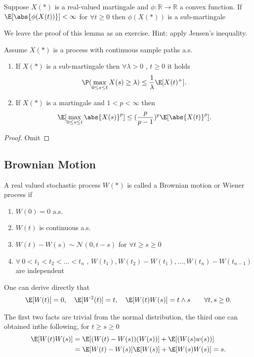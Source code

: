 \begin{lemma}
  Suppose $X(*)$ is a real-valued martingale and $\phi  : \mathbb{R} \to  \mathbb{R}$ a convex function.
  If $\E[\abs{\phi(X(t))}] < \infty $ for $\forall  t\ge 0$ then $\phi(X(*))$ is a sub-martingale
\end{lemma}
We leave the proof of this lemma as an exercise. Hint: apply Jensen's inequality.
\vskip5mm
\begin{theorem}
 Assume $X(*)$  is a process with continuous sample paths a.s. 
 \begin{enumerate}
   \item If $X(*)$ is a sub-martingale then $\forall  \lambda > 0$ , $t \ge 0$ it holds 
     \begin{align*}
       \P(\max_{0\le s\le t} X(s) \ge \lambda ) \le  \frac{1}{\lambda }\E[X(t)^{+} ]
     .\end{align*}
    \item If $X(*)$ is a martingale and $1 < p < \infty$ then
      \begin{align*}
        \E[\max_{0\le s\le t} \abs{X(s) }^{p} ] \le (\frac{p}{p-1})^{p} \E[\abs{X(t)}^{p} ]
      .\end{align*}
 \end{enumerate}
\end{theorem}
\begin{proof}
 Omit 
\end{proof}
\subsection{Brownian Motion}
\begin{definition}
 A real valued stochastic process $W(*)$ is called a Brownian motion 
 or Wiener process if 
 \begin{enumerate}
   \item $W(0) = 0$ a.s.
   \item $W(t)$ is continuous a.s.
   \item $W(t) - W(s) \sim \mathcal{N}(0,t-s)$ for $\forall t\ge s\ge 0$
   \item $\forall \ 0 < t_{1}<t_{2}<\ldots <t_n$ , $W(t_{1}),W(t_{2})-W(t_{1}),\ldots ,W(t_n)-W(t_{n-1})$ are independent 
 \end{enumerate}
\end{definition}
\begin{remark}
 One can derive directly that 
 \begin{align*}
   \E[W(t)] = 0, \quad \E[W^2(t)] = t, \quad \E[W(t)W(s)] = t\land s\qquad \forall t,s \ge 0
 .\end{align*}
\end{remark}
The first two facts are trivial from the normal distribution, the third one can obtained inthe following, for $t\ge s\geq 0$ 
\begin{align*}
  \E[W(t)W(s)] &= \E[(W(t)-W(s))(W(s))]+\E[(W(s)w(s))]\\
               &= \E[W(t)-W(s)]\E[W(s)] + \E[W(s)W(s)] = s
.\end{align*}

